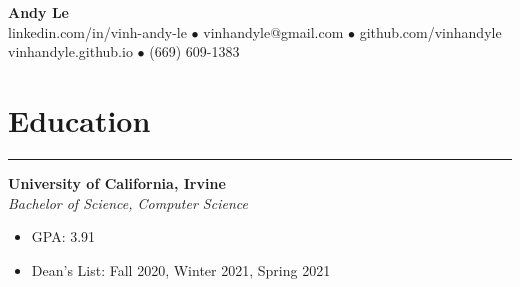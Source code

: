 \documentclass{article}
\begin{document}
   \begin{center}
      \Huge\textbf{Andy Le}\\
      \normalsize{linkedin.com/in/vinh-andy-le} $\bullet$
      \normalsize{vinhandyle@gmail.com} $\bullet$
      \normalsize{github.com/vinhandyle}\\
      \normalsize{vinhandyle.github.io} $\bullet$
      \normalsize{(669) 609-1383}
   \end{center}
\vspace{-20pt}

\section*{Education} \vspace{-6pt} \hrule \vspace{6pt}
\textbf{University of California, Irvine}\\
\textit{Bachelor of Science, Computer Science}
\begin{itemize}
	\item\vspace{-6pt} GPA: 3.91
	\item\vspace{-6pt} Dean's List: Fall 2020, Winter 2021, Spring 2021
\end{itemize}
\vspace{-20pt}
\end{document}
